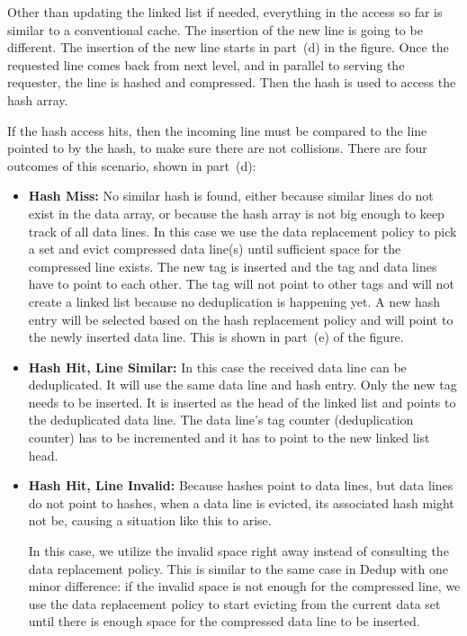 Other than updating the linked list if needed, everything in the access so far is similar to a conventional cache. The insertion of the new line is going to be different. The insertion of the new line starts in part~(d) in the figure. Once the requested line comes back from next level, and in parallel to serving the requester, the line is hashed and compressed. Then the hash is used to access the hash array.\par
If the hash access hits, then the incoming line must be compared to the line pointed to by the hash, to make sure there are not collisions. There are four outcomes of this scenario, shown in part~(d):
\begin{itemize}
    \item \textbf{Hash Miss:} No similar hash is found, either because similar lines do not exist in the data array, or because the hash array is not big enough to keep track of all data lines. In this case we use the data replacement policy to pick a set and evict compressed data line(s) until sufficient space for the compressed line exists. The new tag is inserted and the tag and data lines have to point to each other. The tag will not point to other tags and will not create a linked list because no deduplication is happening yet. A new hash entry will be selected based on the hash replacement policy and will point to the newly inserted data line. This is shown in part~(e) of the figure.
    \item \textbf{Hash Hit, Line Similar:} In this case the received data line can be deduplicated. It will use the same data line and hash entry. Only the new tag needs to be inserted. It is inserted as the head of the linked list and points to the deduplicated data line. The data line's tag counter (deduplication counter) has to be incremented and it has to point to the new linked list head.
    \item \textbf{Hash Hit, Line Invalid:}\label{itm:override} Because hashes point to data lines, but data lines do not point to hashes, when a data line is evicted, its associated hash might not be, causing a situation like this to arise.\par
    In this case, we utilize the invalid space right away instead of consulting the data replacement policy. This is similar to the same case in Dedup with one minor difference: if the invalid space is not enough for the compressed line, we use the data replacement policy to start evicting from the current data set until there is enough space for the compressed data line to be inserted.\par

\end{itemize}

